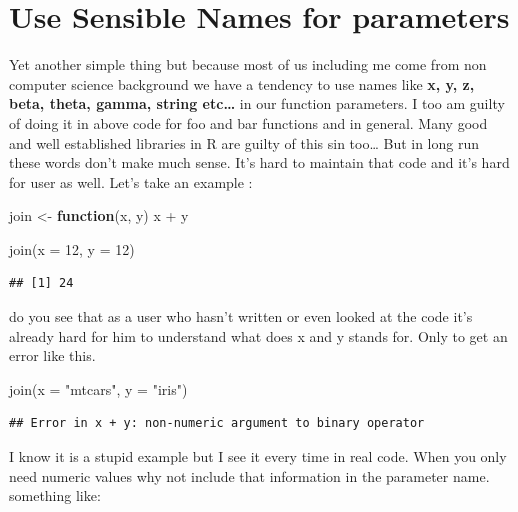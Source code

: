 \documentclass[
]{book}
\newenvironment{Shaded}{\begin{snugshade}}{\end{snugshade}}
\newcommand{\AttributeTok}[1]{\textcolor[rgb]{0.77,0.63,0.00}{#1}}
\newcommand{\ControlFlowTok}[1]{\textcolor[rgb]{0.13,0.29,0.53}{\textbf{#1}}}
\newcommand{\DecValTok}[1]{\textcolor[rgb]{0.00,0.00,0.81}{#1}}
\newcommand{\FunctionTok}[1]{\textcolor[rgb]{0.00,0.00,0.00}{#1}}
\newcommand{\NormalTok}[1]{#1}
\newcommand{\OtherTok}[1]{\textcolor[rgb]{0.56,0.35,0.01}{#1}}
\newcommand{\SpecialCharTok}[1]{\textcolor[rgb]{0.00,0.00,0.00}{#1}}
\newcommand{\StringTok}[1]{\textcolor[rgb]{0.31,0.60,0.02}{#1}}
\begin{document}
\hypertarget{use-sensible-names-for-parameters}{%
\section{Use Sensible Names for parameters}\label{use-sensible-names-for-parameters}}

Yet another simple thing but because most of us including me come from non computer science background we have a tendency to use names like \textbf{x, y, z, beta, theta, gamma, string etc\ldots{}} in our function parameters. I too am guilty of doing it in above code for foo and bar functions and in general. Many good and well established libraries in R are guilty of this sin too\ldots{} But in long run these words don't make much sense. It's hard to maintain that code and it's hard for user as well. Let's take an example :

\begin{Shaded}
\begin{Highlighting}[]
\NormalTok{join }\OtherTok{\textless{}{-}} \ControlFlowTok{function}\NormalTok{(x, y) x }\SpecialCharTok{+}\NormalTok{ y}

\FunctionTok{join}\NormalTok{(}\AttributeTok{x =} \DecValTok{12}\NormalTok{, }\AttributeTok{y =} \DecValTok{12}\NormalTok{)}
\end{Highlighting}
\end{Shaded}

\begin{verbatim}
## [1] 24
\end{verbatim}

do you see that as a user who hasn't written or even looked at the code it's already hard for him to understand what does x and y stands for. Only to get an error like this.

\begin{Shaded}
\begin{Highlighting}[]
\FunctionTok{join}\NormalTok{(}\AttributeTok{x =} \StringTok{"mtcars"}\NormalTok{, }\AttributeTok{y =} \StringTok{"iris"}\NormalTok{)}
\end{Highlighting}
\end{Shaded}

\begin{verbatim}
## Error in x + y: non-numeric argument to binary operator
\end{verbatim}

I know it is a stupid example but I see it every time in real code. When you only need numeric values why not include that information in the parameter name. something like:
\end{document}
